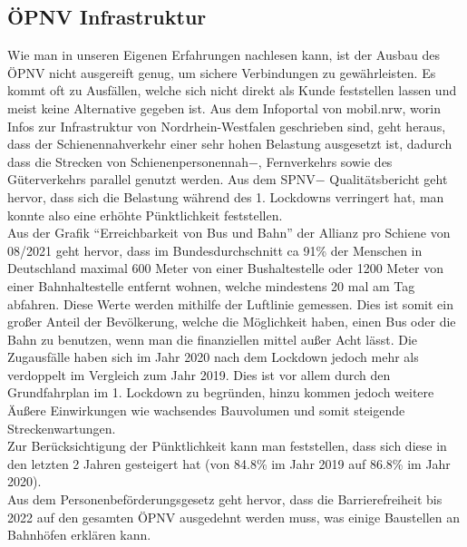 \documentclass[a4paper,12pt]{scrartcl}
\begin{document}
\subsection{ÖPNV Infrastruktur}
Wie man in unseren Eigenen Erfahrungen nachlesen kann, ist der Ausbau des ÖPNV nicht ausgereift genug, um sichere Verbindungen zu gewährleisten. Es kommt oft zu Ausfällen, welche sich nicht direkt als Kunde feststellen lassen und meist keine Alternative gegeben ist. Aus dem Infoportal von mobil.nrw, worin Infos zur Infrastruktur von Nordrhein-Westfalen geschrieben sind, geht heraus, dass der Schienennahverkehr einer sehr hohen Belastung ausgesetzt ist, dadurch dass die Strecken von Schienenpersonennah$-$, Fernverkehrs sowie des Güterverkehrs parallel genutzt werden. Aus dem SPNV$-$ Qualitätsbericht geht hervor, dass sich die Belastung während des 1. Lockdowns verringert hat, man konnte also eine erhöhte Pünktlichkeit feststellen. \\
Aus der Grafik ``Erreichbarkeit von Bus und Bahn'' der Allianz pro Schiene von 08/2021 geht hervor, dass im Bundesdurchschnitt ca 91\% der Menschen in Deutschland maximal 600 Meter von einer Bushaltestelle oder 1200 Meter von einer Bahnhaltestelle entfernt wohnen, welche mindestens 20 mal am Tag abfahren. Diese Werte werden mithilfe der Luftlinie gemessen. Dies ist somit ein großer Anteil der Bevölkerung, welche die Möglichkeit haben, einen Bus oder die Bahn zu benutzen, wenn man die finanziellen mittel außer Acht lässt. Die Zugausfälle haben sich im Jahr 2020 nach dem Lockdown jedoch mehr als verdoppelt im Vergleich zum Jahr 2019. Dies ist vor allem durch den Grundfahrplan im 1. Lockdown zu begründen, hinzu kommen jedoch weitere Äußere Einwirkungen wie wachsendes Bauvolumen und somit steigende Streckenwartungen.\\
Zur Berücksichtigung der Pünktlichkeit kann man feststellen, dass sich diese in den letzten 2 Jahren gesteigert hat (von 84.8\% im Jahr 2019 auf 86.8\% im Jahr 2020).\\
Aus dem Personenbeförderungsgesetz geht hervor, dass die Barrierefreiheit bis 2022 auf den gesamten ÖPNV ausgedehnt werden muss, was einige Baustellen an Bahnhöfen erklären kann.
\end{document}

